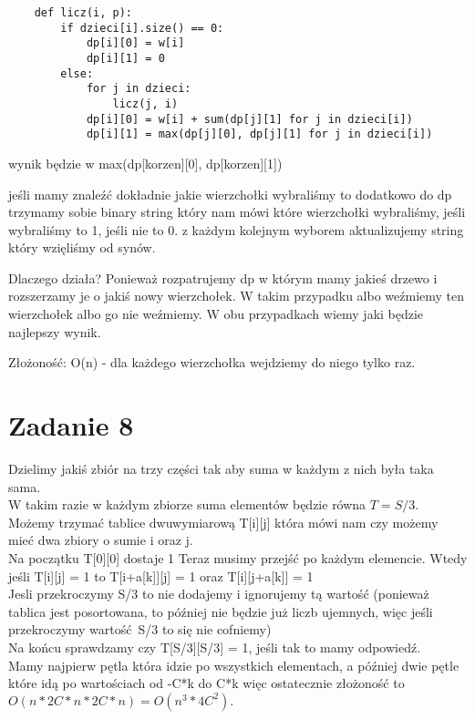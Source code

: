 \documentclass[12pt]{article}
\begin{document}
\begin{lstlisting}
    def licz(i, p):
        if dzieci[i].size() == 0:
            dp[i][0] = w[i]
            dp[i][1] = 0 
        else:
            for j in dzieci: 
                licz(j, i)
            dp[i][0] = w[i] + sum(dp[j][1] for j in dzieci[i])
            dp[i][1] = max(dp[j][0], dp[j][1] for j in dzieci[i])
\end{lstlisting}
wynik będzie w max(dp[korzen][0], dp[korzen][1])


jeśli mamy znaleźć dokładnie jakie wierzchołki wybraliśmy to dodatkowo do dp trzymamy sobie binary string który nam mówi które wierzchołki wybraliśmy, jeśli wybraliśmy to 1, jeśli nie to 0. z każdym kolejnym wyborem aktualizujemy string który wzięliśmy od synów.


Dlaczego działa? Ponieważ rozpatrujemy dp w którym mamy jakieś drzewo i rozszerzamy je o jakiś nowy wierzchołek. W takim przypadku albo weźmiemy ten wierzchołek albo go nie weźmiemy. W obu przypadkach wiemy jaki będzie najlepszy wynik.

Złożoność:
O(n) - dla każdego wierzchołka wejdziemy do niego tylko raz. 


\section{Zadanie 8}

Dzielimy jakiś zbiór na trzy części tak aby suma w każdym z nich była taka sama. \\

W takim razie w każdym zbiorze suma elementów będzie równa $T = S/3$.\\ 

Możemy trzymać tablice dwuwymiarową T[i][j] która mówi nam czy możemy mieć dwa zbiory o sumie i oraz j.\\

Na początku T[0][0] dostaje 1
Teraz musimy przejść po każdym elemencie. 
Wtedy jeśli T[i][j] = 1 to T[i+a[k]][j] = 1 oraz T[i][j+a[k]] = 1\\ 

Jesli przekroczymy S/3 to nie dodajemy i ignorujemy tą wartość (ponieważ tablica jest posortowana, to później nie będzie już liczb ujemnych, więc jeśli przekroczymy wartość S/3 to się nie cofniemy)\\
 

Na końcu sprawdzamy czy T[S/3][S/3] = 1, jeśli tak to mamy odpowiedź.\\


Mamy najpierw pętla która idzie po wszystkich elementach, a później dwie pętle które idą po wartościach od -C*k do C*k więc ostatecznie złożoność to $O(n * 2C*n * 2C*n) = O(n^3 * 4C^2).$\\
\end{document}
